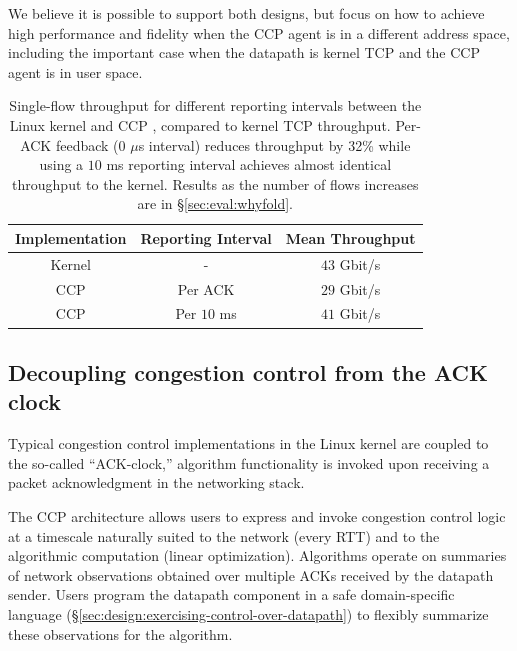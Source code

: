 We believe it is possible to support both designs, but focus on how to achieve high performance
and fidelity when the CCP agent is in a different address space, including the important
case when the datapath is kernel TCP and the CCP agent is in user space. 



\begin{table}[]
    \centering
    \begin{tabular}{c|c|c}
        Implementation & Reporting Interval & Mean Throughput \\
        \hline
        Kernel & - & $43$ Gbit/s \\
        CCP & Per ACK & $29$ Gbit/s \\
        CCP & Per $10$ ms & $41$ Gbit/s \\
    \end{tabular}
    \caption{Single-flow throughput for different reporting intervals between
      the Linux kernel and CCP \userspace, compared to kernel TCP
      throughput. Per-ACK feedback (0 $\mu$s interval) reduces throughput by
      32\% while using a $10$ ms reporting interval
      achieves almost identical throughput to the kernel. Results as the number
      of flows  increases are in
      \S\ref{sec:eval:whyfold}.}\label{tab:perf:interval}
\end{table}

\subsection{Decoupling congestion control from the ACK clock}
\label{sec:design:decoupling-cc-from-ack-clock}

Typical congestion control
implementations in the Linux kernel are coupled to the so-called ``ACK-clock,''
\ie algorithm functionality is invoked upon receiving a packet acknowledgment in
the networking stack.

The CCP architecture allows users to express and invoke congestion control logic at a timescale naturally suited to the network (\eg every RTT) and to the algorithmic computation (\eg linear optimization). 
%
Algorithms operate on summaries of network observations obtained over multiple ACKs received by the datapath sender.
%
Users program the datapath component in a safe domain-specific language (\S\ref{sec:design:exercising-control-over-datapath}) to flexibly summarize these observations for the algorithm.

